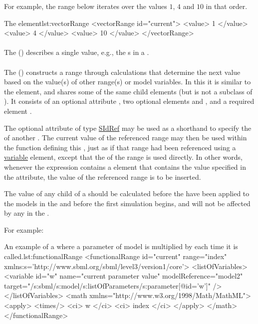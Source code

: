 For example, the range below iterates over the values $1$, $4$ and $10$ in that order.
\begin{myXmlLst}{The  element}{lst:vectorRange}
<vectorRange id="current"> 
	<value> 1 </value> 
	<value> 4 </value> 
	<value> 10 </value> 
</vectorRange> 
\end{myXmlLst}

\paragraph{}
\label{class:value}
The  () describes a single value, e.g., the s in a \VectorRange.

\paragraph{}
\label{class:functionalRange}
The  () constructs a range through calculations that determine the next value based on the value(s) of other range(s) or model variables. In this it is similar to the \ComputeChange element, and shares some of the same child elements (but is not a subclass of \ComputeChange). It consists of an optional attribute , two optional elements \ListOfVariables and \ListOfParameters, and a required element \Math.

The optional attribute  of type \hyperref[type:sidref]{SIdRef} may be used as a shorthand to specify the \hyperref[sec:id]{} of another \Range. The current value of the referenced range may then be used within the function defining this , just as if that range had been referenced using a \hyperref[class:variable]{variable} element, except that the \hyperref[sec:id]{} of the range is used directly. In other words, whenever the expression contains a  element that contains the value specified in the  attribute, the value of the referenced range is to be inserted.

The value of any \Variable child of a \FunctionalRange should be calculated before the \hyperref[sec:changesRepeatedTask]{} have been applied to the models in the \RepeatedTask and before the first simulation begins, and will not be affected by any \SubTask in the \RepeatedTask.

For example:

\begin{myXmlLst}{An example of a  where a parameter  of model  is multiplied by  each time it is called.}{lst:functionalRange}
<functionalRange id="current" range="index"
	xmlns:s='http://www.sbml.org/sbml/level3/version1/core'>
	<listOfVariables>
		<variable id="w" name="current parameter value" modelReference="model2"
			target="/s:sbml/s:model/s:listOfParameters/s:parameter[@id='w']" />
	</listOfVariables>
	<math xmlns="http://www.w3.org/1998/Math/MathML">
	  <apply>
	    <times/>
		  <ci> w </ci>
          <ci> index </ci>
      </apply>
	</math>
</functionalRange>
\end{myXmlLst}

